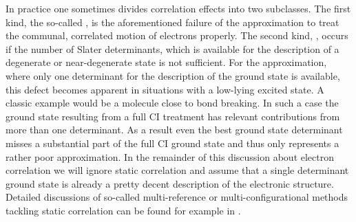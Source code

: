 In practice one sometimes divides correlation effects
into two subclasses.
The first kind, the so-called ,
is the aforementioned failure of the \HF approximation
to treat the communal, correlated motion of electrons properly.
The second kind, ,
occurs if the number of Slater determinants,
which is available for the description of a degenerate or near-degenerate
state is not sufficient.
For the \HF approximation,
where only one determinant for the description of the ground state
is available,
this defect becomes apparent in situations
with a low-lying excited state.
A classic example would be a molecule close to bond breaking.
In such a case the ground state resulting from a full CI treatment
has relevant contributions from more than one determinant.
As a result even the best \HF ground state determinant misses a substantial
part of the full CI ground state and thus only represents
a rather poor approximation.
In the remainder of this discussion about electron correlation
we will ignore static correlation and assume that a single determinant
\HF ground state is already a pretty decent description of the electronic structure.
Detailed discussions of so-called multi-reference
or multi-configurational methods tackling static correlation
can be found for example in \cite{McWeeny1985,Fischer1986,Jensen2007book,Helgaker2013}.


